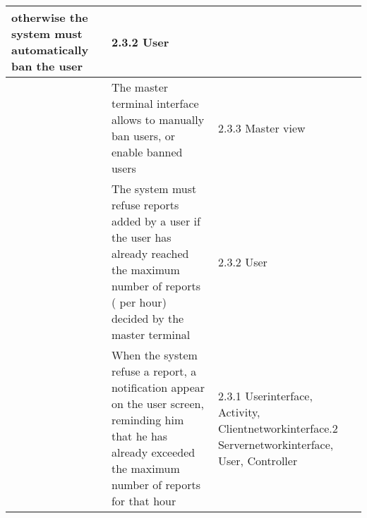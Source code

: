 \begin{center}
\begin{longtable}{| m{2cm} | m{6cm} | m{5cm} | }
	otherwise the system must automatically ban the user&  2.3.2 User\\ \hline
      & The master terminal interface allows to manually ban users, or enable banned users& 2.3.3 Master view\\ \hline
      & The system must refuse reports added by a user if the user has already reached the maximum number of reports ( per hour) decided
	 by the master terminal& 2.3.2 User \\ \hline
      & When the system refuse a report, a notification appear on the user screen, reminding him that he has already exceeded
	the maximum number of reports for that hour& 2.3.1 Userinterface, Activity, Clientnetworkinterface\newline
						     2.3.2 Servernetworkinterface, User, Controller\\ \hline
 \end{longtable}
\end{center}
